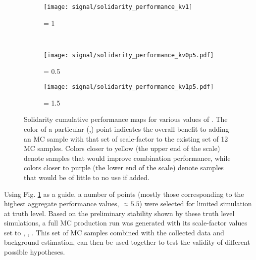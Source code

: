     \begin{figure}[tbh]
        \begin{subfigure}{0.5\textwidth}
            \texttt{[image: signal/solidarity\_performance\_kv1]}
            \captionsetup{justification=centering} \caption{\kv = 1}
        \end{subfigure}\\
        \begin{subfigure}{0.5\textwidth}
            \texttt{[image: signal/solidarity\_performance\_kv0p5.pdf]}
            \captionsetup{justification=centering} \caption{\kv = 0.5}
        \end{subfigure}
        \begin{subfigure}{0.5\textwidth}
            \texttt{[image: signal/solidarity\_performance\_kv1p5.pdf]}
            \captionsetup{justification=centering} \caption{\kv = 1.5}
        \end{subfigure}
        \caption{
            Solidarity cumulative performance maps for various values of \kv.
            The color of a particular (\kvv,\kl) point indicates the overall
                benefit to adding an MC sample with that set of scale-factor
                to the existing set of 12 MC samples.
            Colors closer to yellow (the upper end of the scale) denote samples that would improve combination performance,
                while colors closer to purple (the lower end of the scale) denote samples that would be of little to no use if added.
        }
        \label{fig:solidarity_performance_map}
    \end{figure}

    Using Fig. \ref{fig:solidarity_performance_map} as a guide,
        a number of points (mostly those corresponding to the highest aggregate performance values, $\approx 5.5$)
        were selected for limited simulation at truth level.
    Based on the preliminary stability shown by these truth level simulations,
        a full MC production run was generated with its scale-factor values set to , , .
    This set of MC samples combined with the collected data and background estimation,
        can then be used together to test the validity of different possible hypotheses.


%
